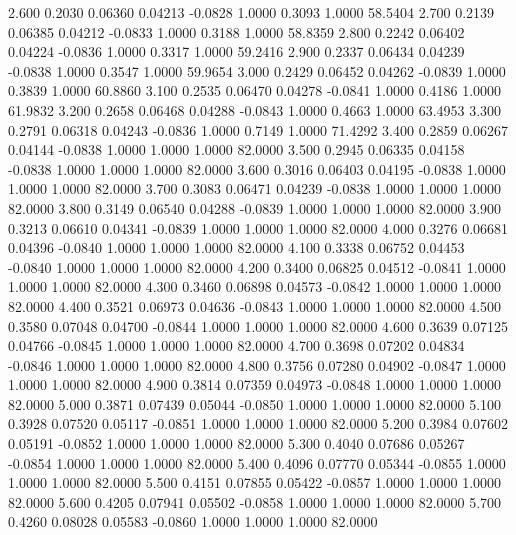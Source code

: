    2.600   0.2030   0.06360   0.04213  -0.0828   1.0000   0.3093   1.0000  58.5404
   2.700   0.2139   0.06385   0.04212  -0.0833   1.0000   0.3188   1.0000  58.8359
   2.800   0.2242   0.06402   0.04224  -0.0836   1.0000   0.3317   1.0000  59.2416
   2.900   0.2337   0.06434   0.04239  -0.0838   1.0000   0.3547   1.0000  59.9654
   3.000   0.2429   0.06452   0.04262  -0.0839   1.0000   0.3839   1.0000  60.8860
   3.100   0.2535   0.06470   0.04278  -0.0841   1.0000   0.4186   1.0000  61.9832
   3.200   0.2658   0.06468   0.04288  -0.0843   1.0000   0.4663   1.0000  63.4953
   3.300   0.2791   0.06318   0.04243  -0.0836   1.0000   0.7149   1.0000  71.4292
   3.400   0.2859   0.06267   0.04144  -0.0838   1.0000   1.0000   1.0000  82.0000
   3.500   0.2945   0.06335   0.04158  -0.0838   1.0000   1.0000   1.0000  82.0000
   3.600   0.3016   0.06403   0.04195  -0.0838   1.0000   1.0000   1.0000  82.0000
   3.700   0.3083   0.06471   0.04239  -0.0838   1.0000   1.0000   1.0000  82.0000
   3.800   0.3149   0.06540   0.04288  -0.0839   1.0000   1.0000   1.0000  82.0000
   3.900   0.3213   0.06610   0.04341  -0.0839   1.0000   1.0000   1.0000  82.0000
   4.000   0.3276   0.06681   0.04396  -0.0840   1.0000   1.0000   1.0000  82.0000
   4.100   0.3338   0.06752   0.04453  -0.0840   1.0000   1.0000   1.0000  82.0000
   4.200   0.3400   0.06825   0.04512  -0.0841   1.0000   1.0000   1.0000  82.0000
   4.300   0.3460   0.06898   0.04573  -0.0842   1.0000   1.0000   1.0000  82.0000
   4.400   0.3521   0.06973   0.04636  -0.0843   1.0000   1.0000   1.0000  82.0000
   4.500   0.3580   0.07048   0.04700  -0.0844   1.0000   1.0000   1.0000  82.0000
   4.600   0.3639   0.07125   0.04766  -0.0845   1.0000   1.0000   1.0000  82.0000
   4.700   0.3698   0.07202   0.04834  -0.0846   1.0000   1.0000   1.0000  82.0000
   4.800   0.3756   0.07280   0.04902  -0.0847   1.0000   1.0000   1.0000  82.0000
   4.900   0.3814   0.07359   0.04973  -0.0848   1.0000   1.0000   1.0000  82.0000
   5.000   0.3871   0.07439   0.05044  -0.0850   1.0000   1.0000   1.0000  82.0000
   5.100   0.3928   0.07520   0.05117  -0.0851   1.0000   1.0000   1.0000  82.0000
   5.200   0.3984   0.07602   0.05191  -0.0852   1.0000   1.0000   1.0000  82.0000
   5.300   0.4040   0.07686   0.05267  -0.0854   1.0000   1.0000   1.0000  82.0000
   5.400   0.4096   0.07770   0.05344  -0.0855   1.0000   1.0000   1.0000  82.0000
   5.500   0.4151   0.07855   0.05422  -0.0857   1.0000   1.0000   1.0000  82.0000
   5.600   0.4205   0.07941   0.05502  -0.0858   1.0000   1.0000   1.0000  82.0000
   5.700   0.4260   0.08028   0.05583  -0.0860   1.0000   1.0000   1.0000  82.0000
